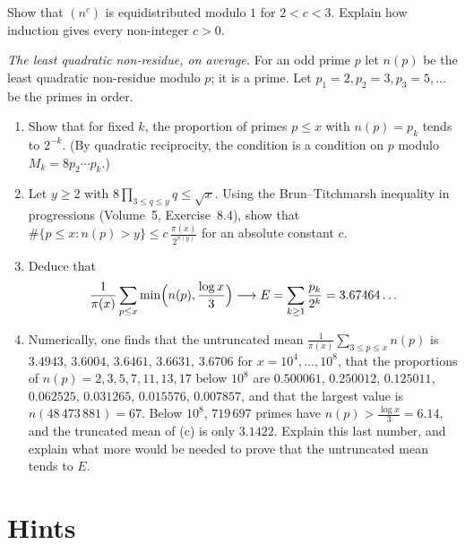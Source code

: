 \begin{exercise}[$\star\star\star$]\label{ex:nc23}
Show that $(n^c)$ is equidistributed modulo $1$ for $2<c<3$. Explain how induction gives every non-integer $c>0$.
\end{exercise}

\begin{exercise}[Journey]\label{pb:erdosnp}
\emph{The least quadratic non-residue, on average.} For an odd prime $p$ let $n(p)$ be the least quadratic non-residue modulo $p$; it is a prime. Let
$p_1=2,p_2=3,p_3=5,\dots$ be the primes in order.
\begin{enumerate}[label=(\alph*)]
\item Show that for fixed $k$, the proportion of primes $p\le x$ with $n(p)=p_k$ tends to $2^{-k}$. (By quadratic reciprocity, the condition is a condition on $p$ modulo
$M_k=8p_2\cdots p_k$.)
\item Let $y\ge2$ with $8\prod_{3\le q\le y}q\le\sqrt x$. Using the Brun--Titchmarsh inequality in progressions (Volume~5, Exercise~8.4), show that
$\#\{p\le x:n(p)>y\}\le c\,\frac{\pi(x)}{2^{\pi(y)}}$ for an absolute constant $c$.
\item Deduce that
\[
\frac1{\pi(x)}\sum_{p\le x}\min\Bigl(n(p),\frac{\log x}3\Bigr)\longrightarrow E=\sum_{k\ge1}\frac{p_k}{2^k}=3.67464\ldots
\]
\item Numerically, one finds that the untruncated mean $\frac1{\pi(x)}\sum_{3\le p\le x}n(p)$ is $3.4943$, $3.6004$, $3.6461$, $3.6631$, $3.6706$ for $x=10^4,\dots,10^8$, that
the proportions of $n(p)=2,3,5,7,11,13,17$ below $10^8$ are $0.500061$, $0.250012$, $0.125011$, $0.062525$, $0.031265$, $0.015576$, $0.007857$, and that the largest value is
$n(48\,473\,881)=67$. Below $10^8$, $719\,697$ primes have $n(p)>\frac{\log x}3=6.14$, and the truncated mean of (c) is only $3.1422$. Explain this last number, and
explain what more would be needed to prove that the untruncated mean tends to $E$.
\end{enumerate}
\end{exercise}

\section{Hints}

